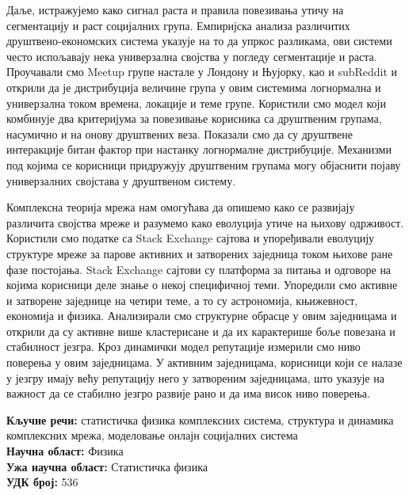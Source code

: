 Даље, истражујемо како сигнал раста и правила повезивања утичу на сегментацију и раст социјалних група. Емпиријска анализа различитих друштвено-економских система указује на то да упркос разликама, ови системи често испољавају нека универзална својства у погледу сегментације и раста. Проучавали смо {Meetup} групе настале у Лондону и Њујорку, као и {subReddit} и открили да је дистрибуција величине група у овим системима логнормална и универзална током времена, локације и теме групе. Користили смо модел који комбинује два критеријума за повезивање корисника са друштвеним групама, насумично и на онову друштвених веза. Показали смо да су друштвене интеракције битан фактор при настанку логнормалне дистрибуције. Механизми под којима се корисници придружују друштвеним групама могу објаснити појаву универзалних својстава у друштвеном систему.

Комплексна теорија мрежа нам омогућава да опишемо како се развијају различита својства мреже и разумемо како еволуција утиче на њихову одрживост. Користили смо податке са {Stack Exchange} сајтова и упоређивали еволуцију структуре мреже за парове активних и затворених заједница током њихове ране фазе постојања. {Stack Exchange} сајтови су платформа за питања и одговоре на којима корисници деле знање о некој специфичној теми. Упоредили смо активне и затворене заједнице на четири теме, а то су астрономија, књижевност, економија и физика. Анализирали смо структурне обрасце у овим заједницама и открили да су активне више кластерисане и да их карактерише боље повезана и стабилност језгра. 
Кроз динамички модел репутације измерили смо ниво поверења у овим заједницама. У активним заједницама, корисници који се налазе у језгру имају већу репутацију него у затвореним заједницама, што указује на важност да се стабилно језгро развије рано и да има висок ниво поверења.

\noindent
\textbf{Кључне речи:} статистичка физика комплексних система, структура и динамика комплексних мрежа, моделовање онлајн социјалних система \\
\textbf{Научна област:} Физика \\
\textbf{Ужа научна област:} Статистичка физика \\
\textbf{УДК број:} 536 %


